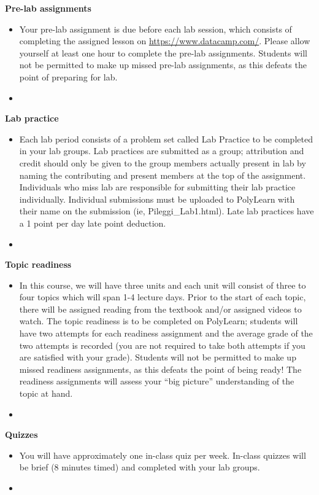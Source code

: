 \documentclass[letterpaper,12pt]{report}
\begin{document}
\textbf{Pre-lab assignments}
\begin{itemize}
\item[]
Your pre-lab assignment is due before each lab session, which consists of completing the assigned lesson on \url{https://www.datacamp.com/}.  Please allow yourself at least one hour to complete the pre-lab assignments.  Students will not be permitted to make up missed pre-lab assignments, as this defeats the point of preparing for lab.
\item[]
\end{itemize}

\textbf{Lab practice}
\begin{itemize}
\item[]
Each lab period consists of a problem set called Lab Practice to be completed in your lab groups. Lab practices are submitted as a group; attribution and credit should only be given to the group members actually present in lab by naming the contributing and present members at the top of the assignment. Individuals who miss lab are responsible for submitting their lab practice individually.  Individual submissions must be uploaded to PolyLearn with their name on the submission (ie, Pileggi\_Lab1.html).  Late lab practices have a 1 point per day late point deduction.
\item[]
\end{itemize}


\textbf{Topic readiness}
\begin{itemize}
\item[]
In this course, we will have three units and each unit will consist of three to four topics which will span 1-4 lecture days. Prior to the start of each topic, there will be assigned reading from the textbook and/or assigned videos to watch. The topic readiness is to be completed on PolyLearn; students will have two attempts for each readiness assignment and the average grade of the two attempts is recorded (you are not required to take both attempts if you are satisfied with your grade). Students will not be permitted to make up missed readiness assignments, as this defeats the point of being ready! The readiness assignments will assess your ``big picture'' understanding of the topic at hand.
\item[]
\end{itemize}


\textbf{Quizzes}
\begin{itemize}
\item[]
You will have approximately one in-class quiz per week.  In-class quizzes will be brief (8 minutes timed) and completed with your lab groups.
\item[]
\end{itemize}
\end{document}
